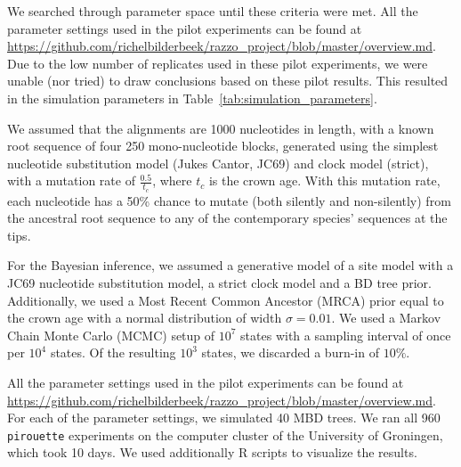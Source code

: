 We searched through parameter space until these criteria were met.
All the parameter settings used in the pilot experiments can be found at 
\url{https://github.com/richelbilderbeek/razzo_project/blob/master/overview.md}.
Due to the low number of replicates used in these pilot experiments, 
we were unable (nor tried) to draw conclusions based on these pilot results.
This resulted in the simulation parameters in Table~\ref{tab:simulation_parameters}.



We assumed that the alignments are 1000 nucleotides in length, with a known root sequence of four 250 mono-nucleotide blocks, generated using the simplest nucleotide substitution model (Jukes Cantor, JC69) and clock model (strict), with a mutation rate of $\frac{0.5}{t_c}$, where $t_c$ is the crown age. 
With this mutation rate, each nucleotide has a 50\% chance to mutate (both silently and non-silently) from the ancestral root sequence to any of the contemporary species' sequences at the tips.

For the Bayesian inference, we assumed a generative model of a site model with 
a JC69 nucleotide substitution model, a strict clock model and a BD tree prior.
Additionally, we used a Most Recent Common Ancestor (MRCA) prior equal to the crown age with a normal distribution of width $\sigma = 0.01$. We used a Markov Chain Monte Carlo (MCMC) setup of $10^7$ states with a sampling interval of once per $10^4$ states. Of the resulting $10^3$ states, we discarded a burn-in of $10\%$.

All the parameter settings used in the pilot experiments can be found at 
\url{https://github.com/richelbilderbeek/razzo_project/blob/master/overview.md}.
For each of the parameter settings, we simulated 40 MBD trees. We ran all
960 \verb;pirouette; experiments on the computer cluster of the University
of Groningen, which took 10 days. We used additionally R scripts to visualize
the results.

